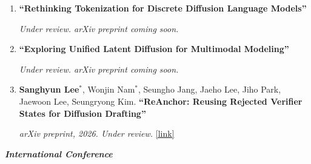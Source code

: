 \documentclass[a4paper,10.5pt]{article}
\begin{document}
\begin{enumerate}
\item \textbf{``Rethinking Tokenization for Discrete Diffusion Language Models''}
\begin{flushright}\vspace{-7pt}
\textit{Under review. arXiv preprint coming soon.}
\end{flushright}

\item \textbf{``Exploring Unified Latent Diffusion for Multimodal Modeling''}
\begin{flushright}\vspace{-7pt}
\textit{Under review. arXiv preprint coming soon.}
\end{flushright}

\item \textbf{Sanghyun Lee}$^\ast$, Wonjin Nam$^\ast$, Seungho Jang, Jaeho Lee, Jiho Park, Jaewoon Lee, Seungryong Kim.
\textbf{``ReAnchor: Reusing Rejected Verifier States for Diffusion Drafting''}
\begin{flushright}\vspace{-7pt}
\textit{arXiv preprint, 2026. Under review.}
\href{https://arxiv.org/abs/2610.26531}{[link]}
\end{flushright}

\end{enumerate}

\vspace{2mm}

\textit{\textbf{International Conference}}
\end{document}
